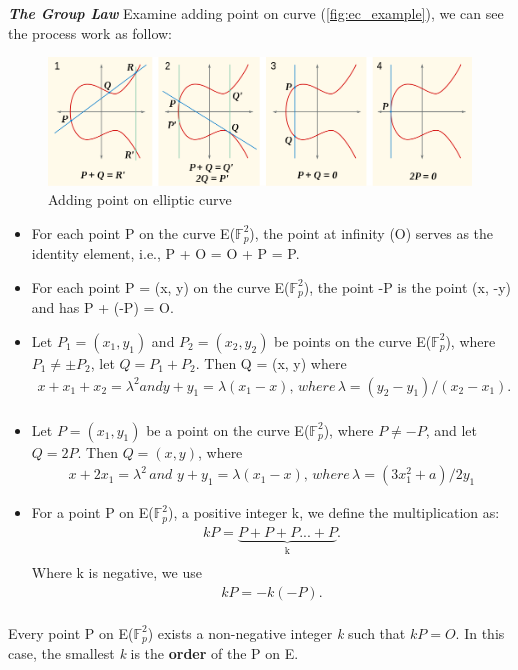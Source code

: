   {\textit {\textbf{The Group Law}}}
Examine adding point on curve (\autoref{fig:ec_example}), we can see the process work as follow:
\begin{figure}[ht!]
  \centering
  \includegraphics[width=1\textwidth]{images/adding_point.png}
  \caption[Adding point on elliptic curve]{Adding point on elliptic curve}
  \label{fig:add_point}
\end{figure}
\begin{itemize}
  \item For each point P on the curve E($\mathbb{F}_{p}^2$), the point at infinity (O) serves as the identity element, i.e., P + O = O + P = P.
  \item For each point P = (x, y) on the curve E($\mathbb{F}_{p}^2$), the point -P is the point (x, -y) and has P + (-P) = O.
  \item Let $P_1 =(x_1, y_1)$ and $P_2 = (x_2, y_2)$ be points on the curve E($\mathbb{F}_{p}^2$), where $P_1 \neq \pm P_2$, let $Q = P_1 + P_2$. Then Q = (x, y) where  \medskip
        \begin{align*}
          x + x_1 + x_2 = \lambda^2 and y + y_1 = \lambda(x_1 - x), \,	where \, \lambda = (y_2 - y_1)/(x_2 - x_1). \\
        \end{align*}
  \item Let $P = (x_1, y_1)$ be a point on the curve E($\mathbb{F}_{p}^2$), where $P \neq -P$, and let $Q = 2P$. Then $Q = (x, y)$, where \medskip
        \begin{align*}
          x + 2x_1 = \lambda^2 \, and \, \, y + y_1 = \lambda(x_1 - x), \, where \, \lambda = (3x_1^2 + a)/2y_1
        \end{align*}
  \item For a point P on E($\mathbb{F}_{p}^2$), a positive integer k, we define the multiplication as: \medskip
        \begin{align*}
          kP = \underbrace{P + P + P ... + P}_\text{k}. \\
        \end{align*}
        Where k is negative, we use
        \begin{align*}
          kP = -k(-P). \\
        \end{align*}
\end{itemize}
Every point P on E($\mathbb{F}_{p}^2$) exists a non-negative integer \emph{k} such that $kP = O$. In this case, the smallest \emph{k} is the {\bf order} of the P on E.

